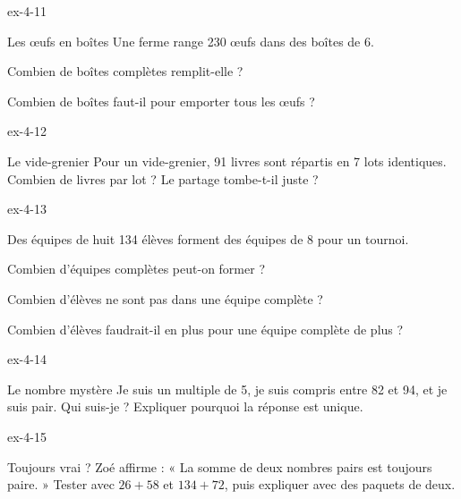\begin{blocLivre}{ex-4-11}\begin{exercice}[3]{Les œufs en boîtes}
Une ferme range 230 œufs dans des boîtes de 6.\begin{questions}
\item Combien de boîtes complètes remplit-elle ?
\item Combien de boîtes faut-il pour emporter tous les œufs ?
\end{questions}
\end{exercice}\end{blocLivre}
\begin{blocLivre}{ex-4-12}\begin{exercice}[3]{Le vide-grenier}
Pour un vide-grenier, 91 livres sont répartis en 7 lots identiques. Combien de livres par lot ? Le partage tombe-t-il juste ?
\end{exercice}\end{blocLivre}
\begin{blocLivre}{ex-4-13}\begin{exercice}[3]{Des équipes de huit}
134 élèves forment des équipes de 8 pour un tournoi.\begin{questions}
\item Combien d’équipes complètes peut-on former ?
\item Combien d’élèves ne sont pas dans une équipe complète ?
\item Combien d’élèves faudrait-il en plus pour une équipe complète de plus ?
\end{questions}
\end{exercice}\end{blocLivre}
\begin{blocLivre}{ex-4-14}\begin{exercice}[3]{Le nombre mystère}
Je suis un multiple de 5, je suis compris entre 82 et 94, et je suis pair. Qui suis-je ? Expliquer pourquoi la réponse est unique.
\end{exercice}\end{blocLivre}
\begin{blocLivre}{ex-4-15}\begin{exercice}[3]{Toujours vrai ?}
Zoé affirme : « La somme de deux nombres pairs est toujours paire. » Tester avec $26+58$ et $134+72$, puis expliquer avec des paquets de deux.
\end{exercice}\end{blocLivre}

\clearpage
